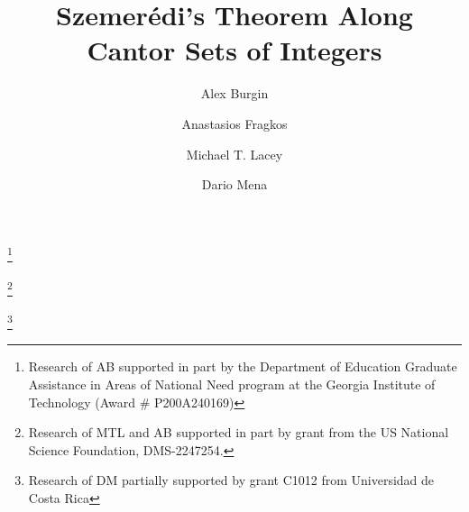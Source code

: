 \documentclass[12pt]{amsart}
\theoremstyle{plain} %
\theoremstyle{definition}
\theoremstyle{remark}
\numberwithin{equation}{section}
\begin{document}
\title[Cantor Szemer\'edi Theorem]{Szemer\'edi's Theorem Along Cantor Sets of Integers}

\author[Burgin]{Alex Burgin} 
    \address{School of Mathematics, Georgia Institute of Technology, Atlanta GA 30332, USA}
    \thanks{Research of AB supported in part by the Department of Education Graduate Assistance in Areas of National Need program at the Georgia Institute of Technology (Award \# P200A240169)}


\author[Fragkos]{Anastasios Fragkos}
\address{ School of Mathematics, Georgia Institute of Technology, Atlanta GA 30332, USA}



\author[Lacey]{Michael T. Lacey} 
    \address{ School of Mathematics, Georgia Institute of Technology, Atlanta GA 30332, USA}
    \thanks{Research of MTL and AB supported in part by grant  from the US National Science Foundation, DMS-2247254.}

 \author[Mena]{Dario Mena}
    \address{Centro de Investigaci\'{o}n en Matem\'{a}tica Pura y Aplicada \\ Escuela de Matem\'{a}tica, Universidad de Costa Rica}
    \thanks{Research of DM partially supported by grant C1012 from Universidad de Costa Rica}
\end{document}
